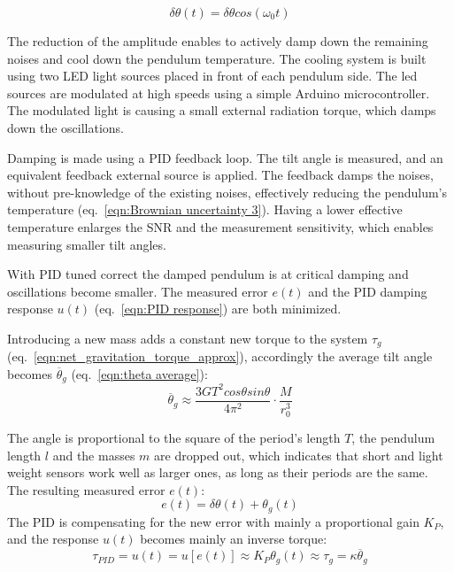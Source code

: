 \documentclass[\main/master.tex]{subfiles}
\begin{document}
\begin{equation}
\delta\theta(t) = \delta\theta cos(\omega_0 t)   \label{eqn:pid_error}
\end{equation}
\par\noindent
The reduction of the amplitude enables to actively damp down the remaining noises and cool down the pendulum temperature. The cooling system is built using two LED light sources placed in front of each pendulum side. The led sources are modulated at high speeds using a simple Arduino microcontroller. The modulated light is causing a small external radiation torque, which damps down the oscillations.
\par\noindent
Damping is made using a PID feedback loop. The tilt angle is measured, and an equivalent feedback external source is applied. The feedback damps the noises, without pre-knowledge of the existing noises, effectively reducing the pendulum's temperature (eq.~\ref{eqn:Brownian uncertainty 3}). Having a lower effective temperature enlarges the SNR and the measurement sensitivity, which enables measuring smaller tilt angles.
\par\noindent
With PID tuned correct the damped pendulum is at critical damping and oscillations become smaller. The measured error $e(t)$ and the PID damping response $u(t)$ (eq.~\ref{eqn:PID response}) are both minimized. 
\par\noindent
Introducing a new mass adds a constant new torque to the system $\tau_g$ (eq.~\ref{eqn:net_gravitation_torque_approx}), accordingly the average tilt angle becomes $\overline{\theta}_g$ (eq.~\ref{eqn:theta average}):
\begin{equation}
\overline{\theta}_g  \approx \frac{3GT^2cos\theta sin\theta}{4\pi^2 } \cdot \frac{M}{r_0^3}   \label{eqn:theta average_2}
\end{equation}
\par\noindent
The angle is proportional to the square of the period's length $T$, the pendulum length $l$ and the masses $m$ are dropped out, which indicates that short and light weight sensors work well as larger ones, as long as their periods are the same. The resulting measured error $e(t)$:
\begin{equation}
e(t) = \delta\theta(t) + \theta_g(t)    \label{eqn:error_measurement}
\end{equation}
The PID is compensating for the new error with mainly a proportional gain $K_P$, and the response $u(t)$ becomes mainly an inverse torque:
\begin{equation}
\tau_{PID} = u(t) = u[e(t)] \approx K_P\theta_g(t) \approx \tau_{g} = \kappa \overline{\theta}_g 
\label{eqn:PID_response}
\end{equation}
\end{document}

